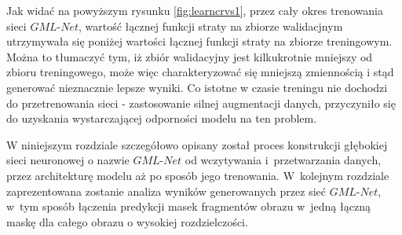 \cell
Jak widać na powyższym rysunku \ref{fig:learncrvs1}, przez cały okres trenowania sieci $\textit{GML-Net}$, wartość łącznej funkcji straty na zbiorze walidacjnym utrzymywała się poniżej wartości łącznej funkcji straty na zbiorze treningowym. Można to tłumaczyć tym, iż zbiór walidacyjny jest kilkukrotnie mniejszy od zbioru treningowego, może więc charakteryzować się mniejszą zmiennością i stąd generować nieznacznie lepsze wyniki. Co istotne w czasie treningu nie dochodzi do przetrenowania sieci - zastosowanie silnej augmentacji danych, przyczyniło się do uzyskania wystarczającej odporności modelu na ten problem.

W niniejszym rozdziale szczegółowo opisany został proces konstrukcji głębokiej sieci neuronowej o nazwie $\textit{GML-Net}$ od wczytywania i~przetwarzania danych, przez architekturę modelu aż po sposób jego trenowania.  W~kolejnym rozdziale zaprezentowana zostanie analiza wyników generowanych przez sieć $\textit{GML-Net}$, w~tym sposób łączenia predykcji masek fragmentów obrazu w~jedną łączną maskę dla całego obrazu o wysokiej rozdzielczości.
